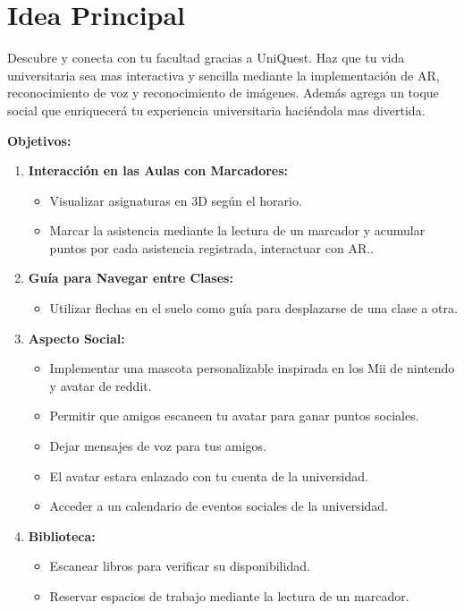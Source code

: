 \documentclass{article}
\begin{document}
\section{Idea Principal}
\label{sec:Idea Principal}
Descubre y conecta con tu facultad gracias a UniQuest. Haz que tu vida universitaria sea mas interactiva y sencilla mediante la implementación de AR, reconocimiento de voz y reconocimiento de imágenes. Además agrega un toque social que enriquecerá tu experiencia universitaria haciéndola mas divertida. 
\vspace*{1\baselineskip}

\raggedright
\textbf{Objetivos:}
\begin{enumerate}
	\item \textbf{Interacción en las Aulas con Marcadores:}
	  \begin{itemize}
		\item Visualizar asignaturas en 3D según el horario.
		\item Marcar la asistencia mediante la lectura de un marcador y acumular puntos por cada asistencia registrada, interactuar con AR..
	  \end{itemize}
  
	\item \textbf{Guía para Navegar entre Clases:}
	  \begin{itemize}
		\item Utilizar flechas en el suelo como guía para desplazarse de una clase a otra.
	  \end{itemize}
  
	\item \textbf{Aspecto Social:}
	  \begin{itemize}
		\item Implementar una mascota personalizable inspirada en los Mii de nintendo y avatar de reddit.
		\item Permitir que amigos escaneen tu avatar para ganar puntos sociales.
		\item Dejar mensajes de voz para tus amigos.
		\item El avatar estara enlazado con tu cuenta de la universidad.
		\item Acceder a un calendario de eventos sociales de la universidad.
	  \end{itemize}
  
	\item \textbf{Biblioteca:}
	  \begin{itemize}
		\item Escanear libros para verificar su disponibilidad.
		\item Reservar espacios de trabajo mediante la lectura de un marcador.
	  \end{itemize}
  \end{enumerate}
\end{document}
